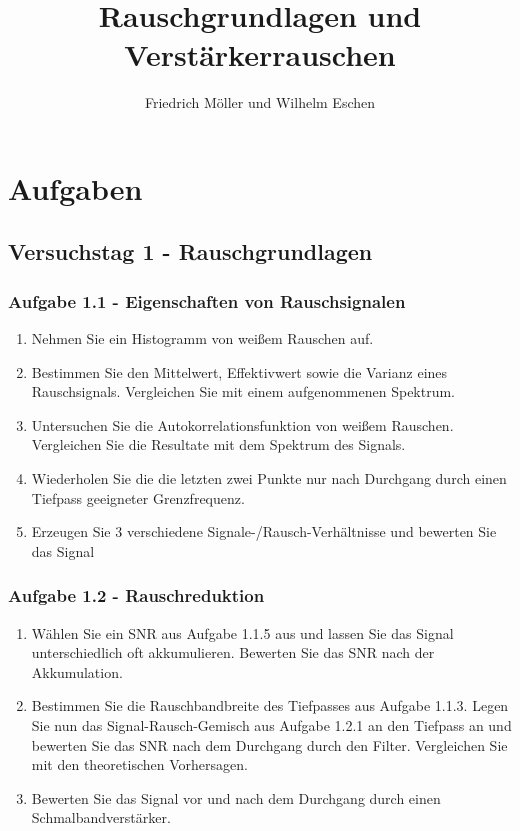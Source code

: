 \documentclass{article}						%
\title{Rauschgrundlagen und Verstärkerrauschen}
\author{Friedrich Möller und Wilhelm Eschen}
\begin{document}
	\maketitle
	\tableofcontents
	\clearpage
			

\section{Aufgaben}
	\subsection*{Versuchstag 1 - Rauschgrundlagen}
		
		\subsubsection*{Aufgabe 1.1 - Eigenschaften von Rauschsignalen}
			\begin{enumerate}
				\item Nehmen Sie ein Histogramm von weißem Rauschen auf.
				\item Bestimmen Sie den Mittelwert, Effektivwert sowie die Varianz eines
Rauschsignals. Vergleichen Sie mit einem aufgenommenen Spektrum.
				\item  Untersuchen Sie die Autokorrelationsfunktion von weißem Rauschen. Vergleichen
Sie die Resultate mit dem Spektrum des Signals.
				\item Wiederholen Sie die die letzten zwei Punkte nur nach Durchgang durch einen Tiefpass geeigneter Grenzfrequenz.
				\item Erzeugen Sie 3 verschiedene Signale-/Rausch-Verhältnisse und bewerten Sie das
Signal
			\end{enumerate}
			
		\subsubsection*{Aufgabe 1.2 - Rauschreduktion}
			\begin{enumerate}
				\item Wählen Sie ein SNR aus Aufgabe 1.1.5 aus und lassen Sie das Signal unterschiedlich
oft akkumulieren. Bewerten Sie das SNR nach der Akkumulation.
				\item Bestimmen Sie die Rauschbandbreite des Tiefpasses aus Aufgabe 1.1.3. Legen Sie
nun das Signal-Rausch-Gemisch aus Aufgabe 1.2.1 an den Tiefpass an und
bewerten Sie das SNR nach dem Durchgang durch den Filter. Vergleichen Sie mit
den theoretischen Vorhersagen.
				\item Bewerten Sie das Signal vor und nach dem Durchgang durch einen Schmalbandverstärker.
\end{enumerate}		
\end{document}
